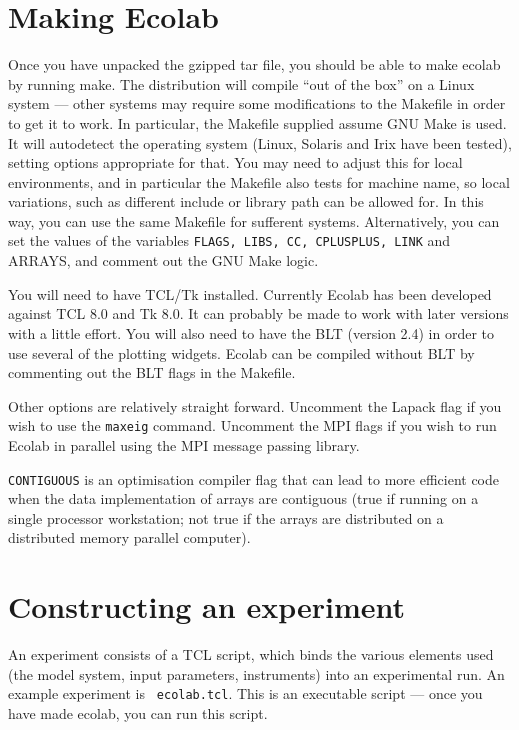 \section{Making Ecolab}

Once you have unpacked the gzipped tar file, you should be able to
make ecolab by running make. The distribution will compile ``out of
the box'' on a Linux system --- other systems may require some
modifications to the Makefile in order to get it to work. In
particular, the Makefile supplied assume GNU Make is used. It will
autodetect the operating system (Linux, Solaris and Irix have been
tested), setting options appropriate for that. You may need to adjust
this for local environments, and in particular the Makefile also tests
for machine name, so local variations, such as different include or
library path can be allowed for. In this way, you can use the same
Makefile for sufferent systems. Alternatively, you can set the values
of the variables {\tt FLAGS, LIBS, CC, CPLUSPLUS, LINK} and {ARRAYS},
and comment out the GNU Make logic.

You will need to have TCL/Tk installed. Currently Ecolab has been
developed against TCL 8.0 and Tk 8.0. It can probably be made to work
with later versions with a little effort. You will also need to have
the BLT (version 2.4) in order to use several of the plotting
widgets. Ecolab can be compiled without BLT by commenting out the BLT flags
in the Makefile.

Other options are relatively straight forward. Uncomment the Lapack
flag if you wish to use the {\tt maxeig} command. Uncomment the MPI
flags if you wish to run Ecolab in parallel using the MPI message
passing library.

{\tt CONTIGUOUS} is an optimisation compiler flag that can lead to more
efficient code when the data implementation of arrays are contiguous
(true if running on a single processor workstation; not true if the
arrays are distributed on a distributed memory parallel computer).

\section{Constructing an experiment}

An experiment consists of a TCL\cite{Ousterhout94} script, which binds
the various elements used (the model system, input parameters,
instruments) into an experimental run. An example experiment is {\tt
  ecolab.tcl}. This is an executable script --- once you have made
ecolab, you can run this script.

